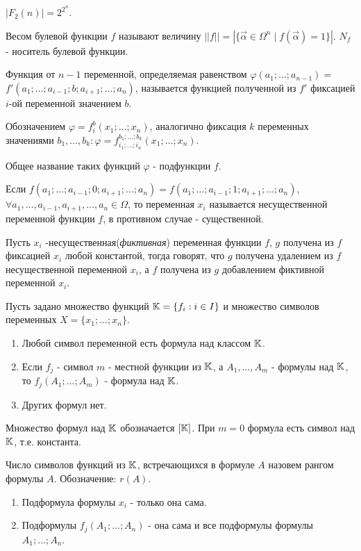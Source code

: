 \utv $|F_2(n)|= 2^{2^n}$.

\opr Весом булевой функции $f$ называют величину $||f|| = |\{\vec{\alpha} \in \Omega^n \mid f(\vec{\alpha}) = 1\}|$. $N_f$ - носитель булевой функции.

\opr Функция от $n-1$ переменной, определяемая равенством $\varphi(a_1; \dots; a_{n-1}) =$\\
$f'(a_1; \dots; a_{i-1}; b; a_{i+1}; \dots; a_n)$, называется
функцией полученной из $f'$ фиксацией $i$-ой переменной значением $b$.

Обозначением $\varphi = f_i^b(x_1; \dots; x_n)$, аналогично фиксация $k$ переменных значениями $b_1,\dots, b_k : \varphi = f_{i_1; \dots; i_n}^{b_1; \dots; b_k}(x_1; \dots; x_n)$.

Общее название таких функций $\varphi$ - подфункции $f$. 

Если $f(a_1; \dots; a_{i-1};0;a_{i+1}; \dots; a_n) = f(a_1; \dots; a_{i-1};1;a_{i+1}; \dots; a_n)$, $\forall a_1, \dots, a_{i-1}, a_{i+1}, \dots, a_n \in \Omega$, то 
переменная $x_i$ называется несущественной переменной функции $f$, в противном случае - существенной.

\opr Пусть $x_i$ -несущественная(\emph{фиктивная}) переменная функции $f$, $g$ получена из $f$ фиксацией $x_i$ любой константой, тогда говорят, что $g$
получена удалением из $f$ несущественной переменной $x_i$, а $f$ получена из $g$ добавлением фиктивной переменной $x_i$.

Пусть задано множество функций $\mathbb{K} = \{f_i : i \in I\}$ и множество символов переменных $X = \{x_1; \dots; x_n\}$.

\opr \begin{enumerate}
    \item Любой символ переменной есть формула над классом $\mathbb{K}$.
    \item Если $f_j$ - символ $m$ - местной функции из $\mathbb{K}$, а $A_1, \dots, A_m$ - формулы над $\mathbb{K}$, то $f_j(A_1; \dots; A_m)$ - формула над $\mathbb{K}$.
    \item Других формул нет.
\end{enumerate}

Множество формул над $\mathbb{K}$ обозначается $[\mathbb{K}]$. При $m=0$ формула есть символ над $\mathbb{K}$, т.е. константа.

\opr Число символов функций из $\mathbb{K}$, встречающихся в формуле $A$ назовем рангом формулы $A$. Обозначение: $r(A)$.

\opr \begin{enumerate}
    \item Подформула формулы $x_i$ - только она сама.
    \item Подформулы $f_j(A_1; \dots; A_n)$ - она сама и все подформулы формулы $A_1; \dots; A_n$.
\end{enumerate}


